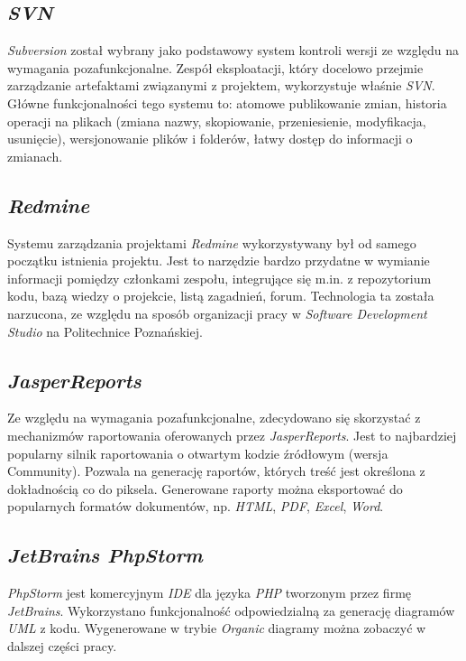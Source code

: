 \subsection{\textit{SVN}}
\label{Chapter637}

\textit{Subversion} został wybrany jako podstawowy system kontroli wersji ze względu na wymagania pozafunkcjonalne. Zespół eksploatacji, który docelowo przejmie zarządzanie artefaktami związanymi z projektem, wykorzystuje właśnie \textit{SVN}. Główne funkcjonalności tego systemu to: atomowe publikowanie zmian, historia operacji na plikach (zmiana nazwy, skopiowanie, przeniesienie, modyfikacja, usunięcie), wersjonowanie plików i folderów, łatwy dostęp do informacji o zmianach.

\subsection{\textit{Redmine}}
\label{Chapter638}

Systemu zarządzania projektami \textit{Redmine} wykorzystywany był od samego początku istnienia projektu. Jest to narzędzie bardzo przydatne w wymianie informacji pomiędzy członkami zespołu, integrujące się m.in. z repozytorium kodu, bazą wiedzy o projekcie, listą zagadnień, forum.  Technologia ta została narzucona, ze względu na sposób organizacji pracy w \textit{Software Development Studio} na Politechnice Poznańskiej.

\subsection{\textit{JasperReports}}
\label{Chapter639}

Ze względu na wymagania pozafunkcjonalne, zdecydowano się skorzystać z mechanizmów raportowania oferowanych przez \textit{JasperReports}. Jest to najbardziej popularny silnik raportowania o otwartym kodzie źródłowym (wersja Community). Pozwala na generację raportów, których treść jest określona z dokładnością co do piksela. Generowane raporty można eksportować do popularnych formatów dokumentów, np. \textit{HTML}, \textit{PDF}, \textit{Excel}, \textit{Word}.

\subsection{\textit{JetBrains PhpStorm}}
\label{Chapter63a}

\textit{PhpStorm} jest komercyjnym \textit{IDE} dla języka \textit{PHP} tworzonym przez firmę \textit{JetBrains}. Wykorzystano funkcjonalność odpowiedzialną za generację diagramów \textit{UML} z kodu. Wygenerowane w trybie \textit{Organic} diagramy można zobaczyć w dalszej części pracy.